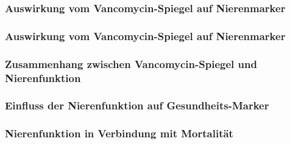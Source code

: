 \documentclass[10pt, aspectratio=169]{beamer}
\begin{document}
\begin{frame}
    \frametitle{Auswirkung vom Vancomycin-Spiegel auf Nierenmarker}
\end{frame}

\begin{frame}
    \frametitle{Auswirkung vom Vancomycin-Spiegel auf Nierenmarker}
\end{frame}

\begin{frame}
	\frametitle{Zusammenhang zwischen Vancomycin-Spiegel und Nierenfunktion}
\end{frame}

\begin{frame}
	\frametitle{Einfluss der Nierenfunktion auf Gesundheits-Marker}
\end{frame}

\begin{frame}
	\frametitle{Nierenfunktion in Verbindung mit Mortalität }
\end{frame}
\end{document}
